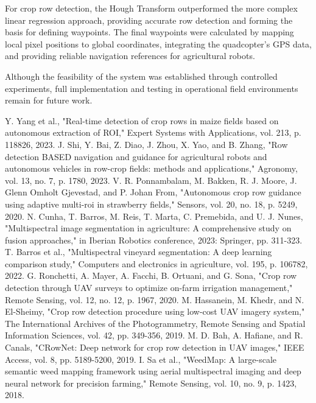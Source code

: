 \documentclass[conference]{IEEEtran}
\begin{document}
For crop row detection, the Hough Transform outperformed the more complex linear regression approach, providing accurate row detection and forming the basis for defining waypoints. The final waypoints were calculated by mapping local pixel positions to global coordinates, integrating the quadcopter's GPS data, and providing reliable navigation references for agricultural robots.

Although the feasibility of the system was established through controlled experiments, full implementation and testing in operational field environments remain for future work.
	
	
	\begin{thebibliography}{00}
		 Y. Yang et al., "Real-time detection of crop rows in maize fields based on autonomous extraction of ROI," Expert Systems with Applications, vol. 213, p. 118826, 2023.
		 J. Shi, Y. Bai, Z. Diao, J. Zhou, X. Yao, and B. Zhang, "Row detection BASED navigation and guidance for agricultural robots and autonomous vehicles in row-crop fields: methods and applications," Agronomy, vol. 13, no. 7, p. 1780, 2023.
		 V. R. Ponnambalam, M. Bakken, R. J. Moore, J. Glenn Omholt Gjevestad, and P. Johan From, "Autonomous crop row guidance using adaptive multi-roi in strawberry fields," Sensors, vol. 20, no. 18, p. 5249, 2020.
		 N. Cunha, T. Barros, M. Reis, T. Marta, C. Premebida, and U. J. Nunes, "Multispectral image segmentation in agriculture: A comprehensive study on fusion approaches," in Iberian Robotics conference, 2023: Springer, pp. 311-323.
		 T. Barros et al., "Multispectral vineyard segmentation: A deep learning comparison study," Computers and electronics in agriculture, vol. 195, p. 106782, 2022.
		 G. Ronchetti, A. Mayer, A. Facchi, B. Ortuani, and G. Sona, "Crop row detection through UAV surveys to optimize on-farm irrigation management," Remote Sensing, vol. 12, no. 12, p. 1967, 2020.
		 M. Hassanein, M. Khedr, and N. El-Sheimy, "Crop row detection procedure using low-cost UAV imagery system," The International Archives of the Photogrammetry, Remote Sensing and Spatial Information Sciences, vol. 42, pp. 349-356, 2019.
		 M. D. Bah, A. Hafiane, and R. Canals, "CRowNet: Deep network for crop row detection in UAV images," IEEE Access, vol. 8, pp. 5189-5200, 2019.
		 I. Sa et al., "WeedMap: A large-scale semantic weed mapping framework using aerial multispectral imaging and deep neural network for precision farming," Remote Sensing, vol. 10, no. 9, p. 1423, 2018.

\end{thebibliography}
\end{document}
